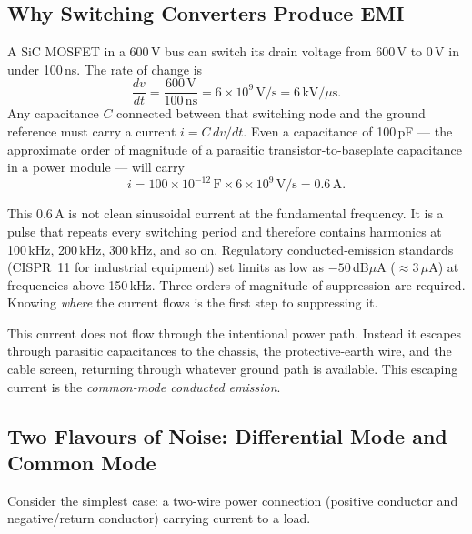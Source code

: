 \subsection{Why Switching Converters Produce EMI}

A SiC MOSFET in a 600\,V bus can switch its drain voltage from
600\,V to 0\,V in under 100\,ns.  The rate of change is
\[
    \frac{dv}{dt} = \frac{600\,\text{V}}{100\,\text{ns}}
                  = 6 \times 10^{9}\,\text{V/s}
                  = 6\,\text{kV/}\mu\text{s}.
\]
Any capacitance $C$ connected between that switching node and the
ground reference must carry a current $i = C\,dv/dt$.  Even a
capacitance of 100\,pF — the approximate order of magnitude of a
parasitic transistor-to-baseplate capacitance in a power module —
will carry
\[
    i = 100 \times 10^{-12}\,\text{F}
        \times 6 \times 10^{9}\,\text{V/s}
      = 0.6\,\text{A}.
\]

\begin{physbox}
This 0.6\,A is not clean sinusoidal current at the fundamental
frequency.  It is a pulse that repeats every switching period and
therefore contains harmonics at 100\,kHz, 200\,kHz, 300\,kHz, and
so on.  Regulatory conducted-emission standards (CISPR~11 for
industrial equipment) set limits as low as $-50$\,dB$\mu$A
($\approx 3\,\mu$A) at frequencies above 150\,kHz.  Three orders
of magnitude of suppression are required.  Knowing \emph{where} the
current flows is the first step to suppressing it.
\end{physbox}

This current does not flow through the intentional power path.
Instead it escapes through parasitic capacitances to the chassis, the
protective-earth wire, and the cable screen, returning through
whatever ground path is available.  This escaping current is the
\emph{common-mode conducted emission}.

\subsection{Two Flavours of Noise: Differential Mode and Common Mode}

Consider the simplest case: a two-wire power connection
(positive conductor and negative/return conductor) carrying current
to a load.

